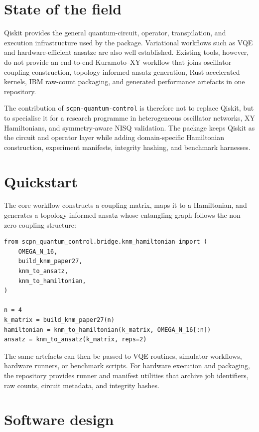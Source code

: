 \documentclass[11pt]{article}
\begin{document}
\section*{State of the field}

Qiskit provides the general quantum-circuit, operator, transpilation, and
execution infrastructure used by the package. Variational workflows such as VQE
and hardware-efficient ansatze are also well established. Existing tools,
however, do not provide an end-to-end Kuramoto--XY workflow that joins
oscillator coupling construction, topology-informed ansatz generation,
Rust-accelerated kernels, IBM raw-count packaging, and generated performance
artefacts in one repository.

The contribution of \texttt{scpn-quantum-control} is therefore not to replace
Qiskit, but to specialise it for a research programme in heterogeneous
oscillator networks, XY Hamiltonians, and symmetry-aware NISQ validation. The
package keeps Qiskit as the circuit and operator layer while adding
domain-specific Hamiltonian construction, experiment manifests, integrity
hashing, and benchmark harnesses.

\section*{Quickstart}

The core workflow constructs a coupling matrix, maps it to a Hamiltonian, and
generates a topology-informed ansatz whose entangling graph follows the
non-zero coupling structure:

\begin{verbatim}
from scpn_quantum_control.bridge.knm_hamiltonian import (
    OMEGA_N_16,
    build_knm_paper27,
    knm_to_ansatz,
    knm_to_hamiltonian,
)

n = 4
k_matrix = build_knm_paper27(n)
hamiltonian = knm_to_hamiltonian(k_matrix, OMEGA_N_16[:n])
ansatz = knm_to_ansatz(k_matrix, reps=2)
\end{verbatim}

The same artefacts can then be passed to VQE routines, simulator workflows,
hardware runners, or benchmark scripts. For hardware execution and packaging,
the repository provides runner and manifest utilities that archive job
identifiers, raw counts, circuit metadata, and integrity hashes.

\section*{Software design}
\end{document}
